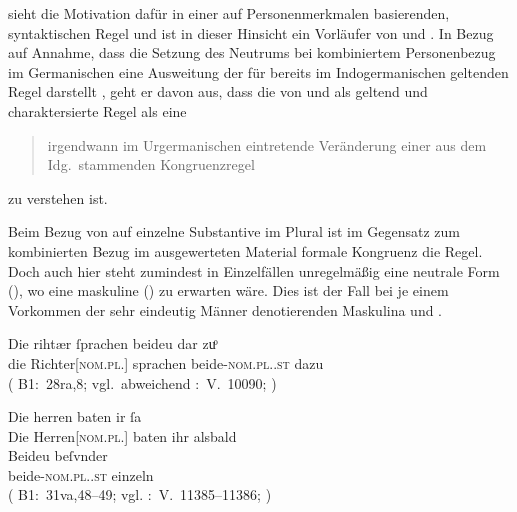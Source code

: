 \citet{askedal1973} sieht die Motivation dafür in einer auf
Personenmerkmalen basierenden, syntaktischen Regel und ist
in dieser Hinsicht ein Vorläufer von \citet{corbett1983} und
\citet{wechslerzlatic2003}. In Bezug auf 
Annahme, dass die Setzung des Neutrums bei kombiniertem Personenbezug im
Germanischen eine Ausweitung der für
 bereits im Indogermanischen geltenden Regel
darstellt \autocite[vgl.~auch][156--157]{hock2008}, geht er davon aus, dass die
von \citet[28]{behaghel1928} und \citet[188]{dal2014} als  geltend und  charaktersierte Regel als eine
\blockcquote[15]{askedal1973}{irgendwann im Urgermanischen
eintretende\textdel{} Veränderung einer aus dem Idg.\ stammenden
Kongruenzregel} zu verstehen ist.

Beim Bezug von  auf einzelne Substantive im Plural ist im Gegensatz
zum kombinierten Bezug im ausgewerteten Material formale Kongruenz die Regel.
Doch auch hier steht zumindest in Einzelfällen unregelmäßig eine
neutrale Form (), wo eine maskuline () zu erwarten
wäre. Dies ist der Fall bei je einem Vorkommen der sehr eindeutig Männer
denotierenden Maskulina   und
  .

\begin{exe}
\ex \label{ex:richtherriu3}
	\begin{xlist}
	\ex \gll Die rihtær ſprachen beideu {dar zuͦ} \\
			die Richter[\textsc{nom.pl.\MascM}] sprachen
				beide-\textsc{nom.pl.\NeutM.st} dazu \\
		\trans {}
			(%
				B1:~28ra,8; vgl.~abweichend
				\KC:~V.~10090;
				\cite[267]{schroeder1895}%
			)
		\label{ex:richtherriu3_1}

	\ex \gll Die herren baten ir ſa \\
			Die Herren[\textsc{nom.pl.\MascM}] baten ihr alsbald \\
	\sn \gll Beideu beſvnder \\
			beide-\textsc{nom.pl.\NeutM.st} einzeln \\
		\trans {}
			(%
				B1:~31va,48--49; vgl.
				\KC:~V.~11385--11386;
				\cite[289]{schroeder1895}%
			)
		\label{ex:richtherriu3_2}
	\end{xlist}
\end{exe}

